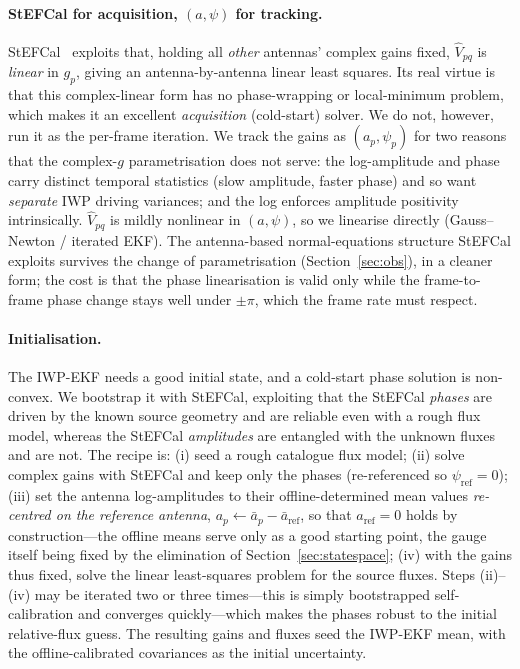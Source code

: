 \documentclass[11pt]{article}
\begin{document}
\paragraph{StEFCal for acquisition, $(a,\psi)$ for tracking.} StEFCal~\cite{stefcal} exploits that,
holding all \emph{other} antennas' complex gains fixed, $\hat V_{pq}$ is \emph{linear} in $g_p$,
giving an antenna-by-antenna linear least squares. Its real virtue is that this complex-linear
form has no phase-wrapping or local-minimum problem, which makes it an excellent \emph{acquisition}
(cold-start) solver. We do not, however, run it as the per-frame iteration. We track the gains as
$(a_p,\psi_p)$ for two reasons that the complex-$g$ parametrisation does not serve: the
log-amplitude and phase carry distinct temporal statistics (slow amplitude, faster phase) and so
want \emph{separate} IWP driving variances; and the log enforces amplitude positivity intrinsically.
$\hat V_{pq}$ is mildly nonlinear in $(a,\psi)$, so we linearise directly (Gauss--Newton / iterated
EKF). The antenna-based normal-equations structure StEFCal exploits survives the change of
parametrisation (Section~\ref{sec:obs}), in a cleaner form; the cost is that the phase linearisation
is valid only while the frame-to-frame phase change stays well under $\pm\pi$, which the frame rate
must respect.

\paragraph{Initialisation.} The IWP-EKF needs a good initial state, and a cold-start phase solution
is non-convex. We bootstrap it with StEFCal, exploiting that the StEFCal \emph{phases} are driven by
the known source geometry and are reliable even with a rough flux model, whereas the StEFCal
\emph{amplitudes} are entangled with the unknown fluxes and are not. The recipe is: (i) seed a rough
catalogue flux model; (ii) solve complex gains with StEFCal and keep only the phases (re-referenced
so $\psi_{\mathrm{ref}}=0$); (iii) set the antenna log-amplitudes to their offline-determined mean
values \emph{re-centred on the reference antenna}, $a_p \leftarrow \bar a_p - \bar a_{\mathrm{ref}}$,
so that $a_{\mathrm{ref}}=0$ holds by construction---the offline means serve only as a good starting
point, the gauge itself being fixed by the elimination of Section~\ref{sec:statespace}; (iv) with the gains thus fixed, solve the linear
least-squares problem for the source fluxes. Steps (ii)--(iv) may be iterated two or
three times---this is simply bootstrapped self-calibration and converges quickly---which makes the
phases robust to the initial relative-flux guess. The resulting gains and fluxes seed the IWP-EKF
mean, with the offline-calibrated covariances as the initial uncertainty.
\end{document}
